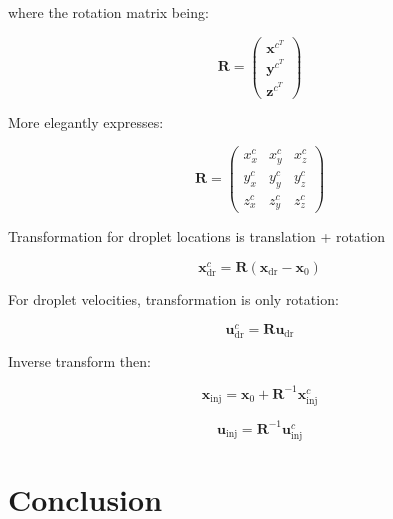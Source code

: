 where the rotation matrix being:

\begin{equation}
\boldsymbol{R} = \begin{pmatrix} \boldsymbol{x}^{c^T} \\ \boldsymbol{y}^{c^T} \\ \boldsymbol{z}^{c^T} \end{pmatrix}
\end{equation}

More elegantly expresses:

\begin{equation}
\boldsymbol{R} = \begin{pmatrix} x^c_x & x^c_y & x^c_z \\ y^c_x & y^c_y & y^c_z \\ z^c_x & z^c_y & z^c_z \end{pmatrix}
\end{equation}



Transformation for droplet locations is translation + rotation

\begin{equation}
\boldsymbol{x}^c_\mathrm{dr} = \boldsymbol{R} \left( \boldsymbol{x}_\mathrm{dr} -  \boldsymbol{x}_0 \right)
\end{equation}

For droplet velocities, transformation is only rotation:

\begin{equation}
\boldsymbol{u}^c_\mathrm{dr} = \boldsymbol{R} \boldsymbol{u}_\mathrm{dr}
\end{equation}

Inverse transform then:

\begin{equation}
\boldsymbol{x}_\mathrm{inj} = \boldsymbol{x}_0 + \boldsymbol{R}^{-1} \boldsymbol{x}_\mathrm{inj}^c
\end{equation}

\begin{equation}
\boldsymbol{u}_\mathrm{inj} = \boldsymbol{R}^{-1} \boldsymbol{u}_\mathrm{inj}^c
\end{equation}

\section{Conclusion}
